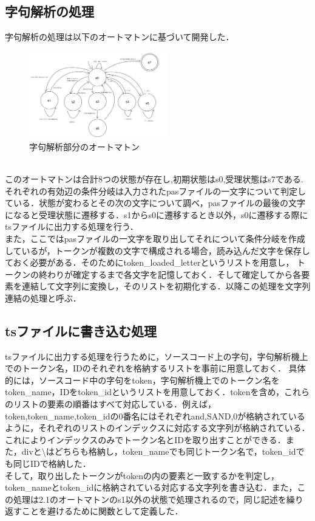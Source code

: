 \documentclass[dvipdfmx]{jarticle}
\begin{document}
\subsection{字句解析の処理}
字句解析の処理は以下のオートマトンに基づいて開発した．
\begin{figure}[h]
    \centering
    \includegraphics[width = 6cm, angle = -90]{automaton.png}
    \caption{字句解析部分のオートマトン}
\end{figure}
\\このオートマトンは合計8つの状態が存在し,初期状態はs0,受理状態はs7である.それぞれの有効辺の条件分岐は入力されたpasファイルの一文字について判定している．状態が変わるとその次の文字について調べ，pasファイルの最後の文字になると受理状態に遷移する．s1からs0に遷移するとき以外，s0に遷移する際にtsファイルに出力する処理を行う．
\\また，ここではpasファイルの一文字を取り出してそれについて条件分岐を作成しているが，トークンが複数の文字で構成される場合，読み込んだ文字を保存しておく必要がある．そのためにtoken\_loaded\_letterというリストを用意し，
トークンの終わりが確定するまで各文字を記憶しておく．そして確定してから各要素を連結して文字列に変換し，そのリストを初期化する．以降この処理を文字列連結の処理と呼ぶ．
\subsection{tsファイルに書き込む処理}
tsファイルに出力する処理を行うために，ソースコード上の字句，字句解析機上でのトークン名，IDのそれぞれを格納するリストを事前に用意しておく．
具体的には，ソースコード中の字句をtoken，字句解析機上でのトークン名をtoken\_name，IDをtoken\_idというリストを用意しておく．tokenを含め，これらのリストの要素の順番はすべて対応している．例えば，token,token\_name,token\_idの0番名にはそれぞれand,SAND,0が格納されているように，それぞれのリストのインデックスに対応する文字列が格納されている．
これによりインデックスのみでトークン名とIDを取り出すことができる．また，divと\textbackslash はどちらも格納し，token\_nameでも同じトークン名で，token\_idでも同じIDで格納した．
\\そして，取り出したトークンがtokenの内の要素と一致するかを判定し，token\_nameとtoken\_idに格納されている対応する文字列を書き込む．また，この処理は2.1のオートマトンのs1以外の状態で処理されるので，同じ記述を繰り返すことを避けるために関数として定義した．
\end{document}
